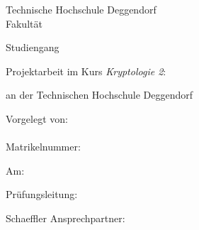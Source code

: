 \begin{titlepage}
\begin{center}
	{
	Technische Hochschule Deggendorf\\
	Fakultät \faculty\par}
	\vspace{.2cm}
{\Large Studiengang \studies\\}
\vspace{4\baselineskip}
{\Huge{}\thesistitleDE\par}
\vspace{.7cm}
{\Huge{}\thesistitleEN\par}
\vspace{4\baselineskip}

Projektarbeit im Kurs \textit{Kryptologie 2}:

	\vspace{.2cm}
	\emph{\degree}
	\vspace{.2cm}

an der Technischen Hochschule Deggendorf\\
\end{center}
\vfill
\parbox[t]{.4\textwidth}{
	Vorgelegt von:\\
	\student\\
	Matrikelnummer: \matrnr\par
	\vspace{\baselineskip}
	Am: \submissiondate\par
}
\hfill
\parbox[t]{.4\textwidth}{
Prüfungsleitung:\\
\supervisor%

\ifthenelse{\equal{\secsupervisor}{}}{}
{%
\vspace{\baselineskip}
Schaeffler Ansprechpartner:\\
\secsupervisor%
}}
\end{titlepage}
\cleardoublepage\par
